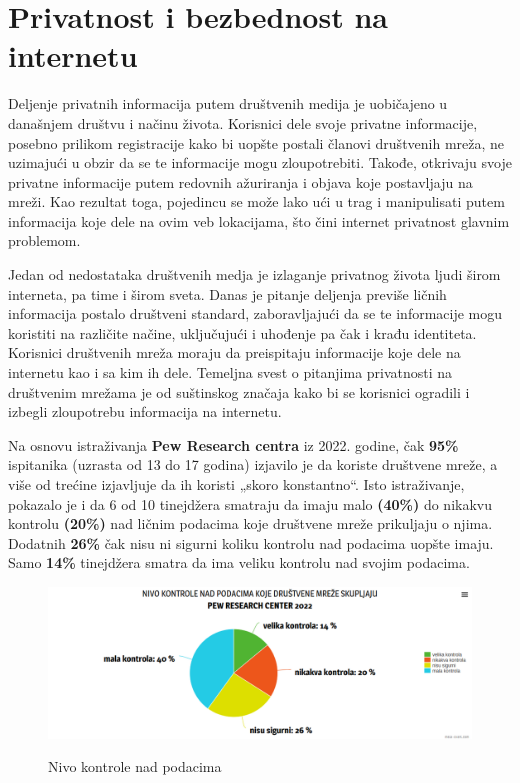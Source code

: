 \documentclass[12pt, a4paper]{article}
\begin{document}
{\newpage


\section{Privatnost i bezbednost na internetu}	
\label{sec:sigurnost}

Deljenje privatnih informacija putem društvenih medija je uobičajeno u današnjem društvu i načinu života. Korisnici dele svoje privatne informacije, posebno prilikom registracije kako bi uopšte postali članovi društvenih mreža, ne uzimajući u obzir da se te informacije mogu zloupotrebiti. Takođe, otkrivaju svoje privatne informacije putem redovnih ažuriranja i objava koje postavljaju na mreži. Kao rezultat toga, pojedincu se može lako ući u trag i manipulisati putem informacija koje dele na ovim veb lokacijama, što čini internet privatnost glavnim problemom.


Jedan od nedostataka društvenih medja je izlaganje privatnog života ljudi širom interneta, pa time i širom sveta. Danas je pitanje deljenja previše ličnih informacija postalo društveni standard, zaboravljajući da se te informacije mogu koristiti na različite načine, uključujući i uhođenje pa čak i krađu identiteta. Korisnici društvenih mreža moraju da preispitaju informacije koje dele na internetu kao i sa kim ih dele.
Temeljna svest o pitanjima privatnosti na društvenim mrežama je od suštinskog značaja kako bi se korisnici ogradili i izbegli zloupotrebu informacija na internetu.

Na osnovu istraživanja \textbf{Pew Research centra} iz 2022. godine\cite{pew2022}, čak \textbf{95\%} ispitanika (uzrasta od 13 do 17 godina) izjavilo je da  koriste društvene mreže, a više od trećine izjavljuje da ih koristi „skoro konstantno“. Isto istraživanje, pokazalo je i da 6 od 10 tinejdžera smatraju da imaju malo \textbf{(40\%) }do nikakvu kontrolu \textbf{(20\%)} nad ličnim podacima koje društvene mreže prikuljaju o njima. Dodatnih \textbf{26\%  }čak nisu ni sigurni koliku kontrolu nad podacima uopšte imaju. Samo \textbf{14\%} tinejdžera smatra da ima veliku kontrolu nad svojim podacima.

\begin{figure}[h]
    \centering
    \includegraphics[scale = 0.3]{stats.png}
    \label{fig:graf1}
    \caption{Nivo kontrole nad podacima}
\end{figure}

}
\end{document}

